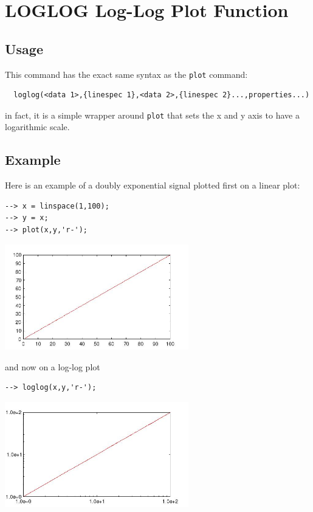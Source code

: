 \section{LOGLOG Log-Log Plot Function}

\subsection{Usage}

This command has the exact same syntax as the \verb|plot| command:
\begin{verbatim}
  loglog(<data 1>,{linespec 1},<data 2>,{linespec 2}...,properties...)
\end{verbatim}
in fact, it is a simple wrapper around \verb|plot| that sets the
x and y axis to have a logarithmic scale.
\subsection{Example}

Here is an example of a doubly exponential signal plotted first on a linear
plot:
\begin{verbatim}
--> x = linspace(1,100);
--> y = x;
--> plot(x,y,'r-');
\end{verbatim}


\centerline{\includegraphics[width=8cm]{loglog1}}

and now on a log-log plot
\begin{verbatim}
--> loglog(x,y,'r-');
\end{verbatim}


\centerline{\includegraphics[width=8cm]{loglog2}}

